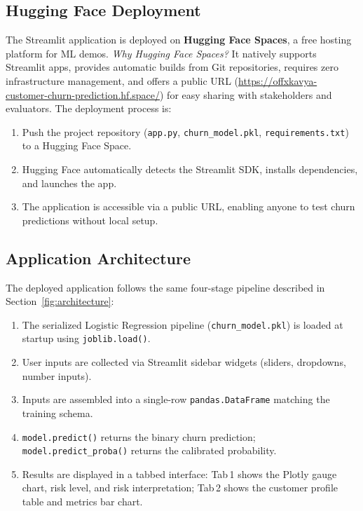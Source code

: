 \documentclass[12pt, a4paper]{article}
\begin{document}
\subsection{Hugging Face Deployment}

The Streamlit application is deployed on \textbf{Hugging Face Spaces}, a free hosting platform for ML demos. \textit{Why Hugging Face Spaces?} It natively supports Streamlit apps, provides automatic builds from Git repositories, requires zero infrastructure management, and offers a public URL (\url{https://offxkavya-customer-churn-prediction.hf.space/}) for easy sharing with stakeholders and evaluators. The deployment process is:

\begin{enumerate}
    \item Push the project repository (\texttt{app.py}, \texttt{churn\_model.pkl}, \texttt{requirements.txt}) to a Hugging Face Space.
    \item Hugging Face automatically detects the Streamlit SDK, installs dependencies, and launches the app.
    \item The application is accessible via a public URL, enabling anyone to test churn predictions without local setup.
\end{enumerate}

\subsection{Application Architecture}

The deployed application follows the same four-stage pipeline described in Section~\ref{fig:architecture}:

\begin{enumerate}
    \item The serialized Logistic Regression pipeline (\texttt{churn\_model.pkl}) is loaded at startup using \texttt{joblib.load()}.
    \item User inputs are collected via Streamlit sidebar widgets (sliders, dropdowns, number inputs).
    \item Inputs are assembled into a single-row \texttt{pandas.DataFrame} matching the training schema.
    \item \texttt{model.predict()} returns the binary churn prediction; \texttt{model.predict\_proba()} returns the calibrated probability.
    \item Results are displayed in a tabbed interface: Tab\,1 shows the Plotly gauge chart, risk level, and risk interpretation; Tab\,2 shows the customer profile table and metrics bar chart.
\end{enumerate}
\end{document}
